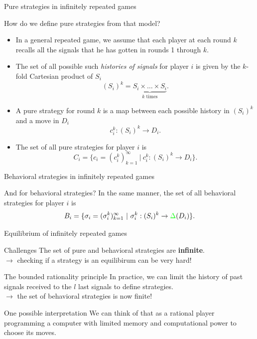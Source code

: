 \begin{frame}{Pure strategies in infinitely repeated games}
    \begin{block}{How do we define pure strategies from that model?}
        \begin{itemize}[<+->]
            \item In a general repeated game, we assume that each player at each round $k$ recalls
            all the signals that he has gotten in rounds 1 through $k$.
            \item The set of all possible such \textit{histories of signals} for player $i$ is given by the
            $k$-fold Cartesian product of $S_i$
            \[ (S_i)^k = \underbrace{S_i \times \dots \times S_i}_{k\text{ times}}.\]
            \item A pure strategy for round $k$ is a map between each possible history in $(S_i)^k$
            and a move in $D_i$
            \[ c^k_i: (S_i)^k \to D_i. \]
            \item The set of all pure strategies for player $i$ is
            \[ C_i = \{c_i = (c_i^k)_{k=1}^\infty~|~ c_i^k: (S_i)^k \to D_i \}. \]
        \end{itemize}
    \end{block}
\end{frame}

\begin{frame}{Behavioral strategies in infinitely repeated games}
    \begin{block}{And for behavioral strategies?}
        In the same manner, the set of all behavioral strategies for player $i$ is
        \[ B_i = \{\sigma_i = (\sigma_i^k)_{k=1}^\infty~|~ \sigma_i^k: (S_i)^k
        \to {\color{green}\Delta}(D_i) \}. \]
    \end{block}
\end{frame}

\begin{frame}{Equilibrium of infinitely repeated games}
    \begin{alertblock}{Challenges}
        The set of pure and behavioral strategies are \textbf{infinite}.\\
        {\color{orange}$\to$ checking if a strategy is an equilibirum can be very hard!}
    \end{alertblock}

    \pause
    \begin{exampleblock}{The bounded rationality principle}
        In practice, we can limit the history of past signals received to the $l$ last signals
        to define strategies.\\
        {\color{green}$\to$ the set of behavioral strategies is now finite!}
    \end{exampleblock}

    \vspace{0.5cm}
    \begin{block}{One possible interpretation}
        We can think of that as a rational player programming a computer with limited memory and
        computational power to choose its moves.
    \end{block}

\end{frame}

